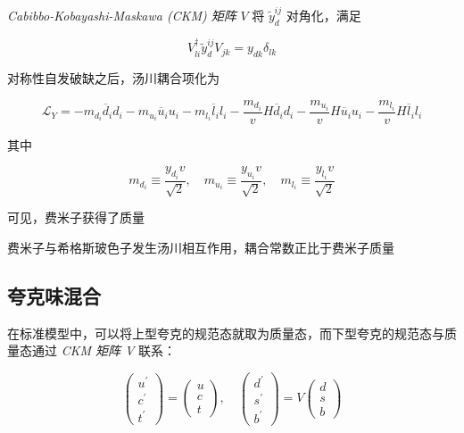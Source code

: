 \documentclass[oneside,a4paper,openany,11pt]{ctexbook}
\begin{document}
\emph{Cabibbo-Kobayashi-Maskawa (CKM) 矩阵} $V$ 将 $\tilde{y}_d^{ij}$ 对角化，满足

\begin{equation}
    V_{li}^\dagger \tilde{y}_d^{ij} V_{jk} = y_{dk} \delta_{lk}
\end{equation}

对称性自发破缺之后，汤川耦合项化为

\begin{equation}
    \mathcal{L}_Y = -m_{d_i} \overline{d}_i d_i - m_{u_i} \overline{u}_i u_i - m_{l_i} \overline{l}_i l_i - \frac{m_{d_i}}{v} H \overline{d}_i d_i - \frac{m_{u_i}}{v} H \overline{u}_i u_i - \frac{m_{l_i}}{v} H \overline{l}_i l_i
\end{equation}

其中

\begin{equation}
    m_{d_i} \equiv \frac{y_{d_i} v}{\sqrt{2}}, \quad m_{u_i} \equiv \frac{y_{u_i} v}{\sqrt{2}}, \quad m_{l_i} \equiv \frac{y_{l_i} v}{\sqrt{2}}
\end{equation}

可见，费米子获得了质量

费米子与希格斯玻色子发生汤川相互作用，耦合常数正比于费米子质量

\subsection{夸克味混合}

在标准模型中，可以将上型夸克的规范态就取为质量态，而下型夸克的规范态与质量态通过  \emph{CKM 矩阵 V} 联系：

\begin{equation}
    \begin{pmatrix}
        u^\prime \\
        c^\prime \\
        t^\prime
    \end{pmatrix} =
    \begin{pmatrix}
        u \\
        c \\
        t
    \end{pmatrix}, \quad
    \begin{pmatrix}
        d^\prime \\
        s^\prime \\
        b^\prime
    \end{pmatrix} = V
    \begin{pmatrix}
        d \\
        s \\
        b
    \end{pmatrix}
\end{equation}
\end{document}

